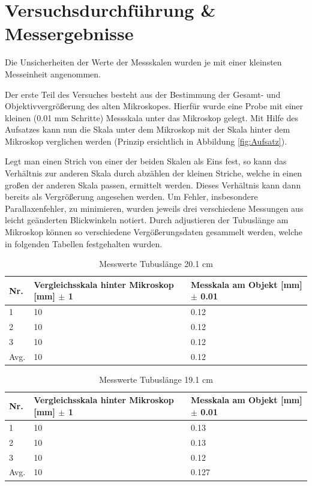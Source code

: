 \documentclass[12pt,a4paper,twoside]{article}
\begin{document}
\section{Versuchsdurchführung \& Messergebnisse} %

Die Unsicherheiten der Werte der Messskalen wurden je mit einer kleinsten Messeinheit angenommen. \newline

\noindent
Der erste Teil des Versuches besteht aus der Bestimmung der Gesamt- und Objektivvergrößerung des alten Mikroskopes.
Hierfür wurde eine Probe mit einer kleinen (0.01 mm Schritte) Messskala unter das Mikroskop gelegt. 
Mit Hilfe des Aufsatzes kann nun die Skala unter dem Mikroskop mit der Skala hinter dem Mikroskop verglichen werden (Prinzip ersichtlich in Abbildung \ref{fig:Aufsatz}). \newline

\noindent
Legt man einen Strich von einer der beiden Skalen als Eins fest, so kann das Verhältnis zur anderen Skala durch abzählen der kleinen Striche, welche in einen großen der anderen Skala passen, ermittelt werden. Dieses Verhältnis kann dann bereits als Vergrößerung angesehen werden.
Um Fehler, insbesondere Parallaxenfehler, zu minimieren, wurden jeweils drei verschiedene Messungen aus leicht geänderten Blickwinkeln notiert.
Durch adjustieren der Tubuslänge am Mikroskop können so verschiedene Vergößerungsdaten gesammelt werden, welche in folgenden Tabellen festgehalten wurden.

\begin{table}[H]
    \centering
    \caption{Messwerte Tubuslänge 20.1 cm}
    \label{tab:messwerteTB20}
    \begin{tabular}{| l | l | l |}
        \hline
        Nr.   & Vergleichsskala hinter Mikroskop [mm] $\pm$ 1  & Messkala am Objekt [mm] $\pm$ 0.01 \\
        \hline
        1 & 10 & 0.12 \\
        2 & 10 & 0.12 \\
        3 & 10 & 0.12 \\
        \hline
        Avg. & 10 & 0.12 \\
        \hline
    \end{tabular}
\end{table}

\begin{table}[H]
    \centering
    \caption{Messwerte Tubuslänge 19.1 cm}
    \label{tab:messwerteTB19}
    \begin{tabular}{| l | l | l |}
        \hline
        Nr.   & Vergleichsskala hinter Mikroskop [mm] $\pm$ 1 & Messkala am Objekt [mm] $\pm$ 0.01 \\
        \hline
        1 & 10 & 0.13 \\
        2 & 10 & 0.13 \\
        3 & 10 & 0.12 \\
        \hline
        Avg. & 10 & 0.127 \\
        \hline
    \end{tabular}
\end{table}
\end{document}
